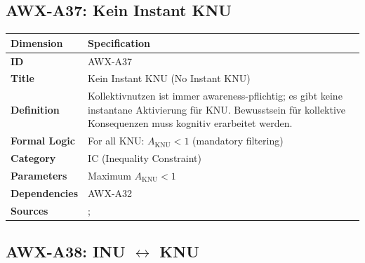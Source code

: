 
\subsection{AWX-A37: Kein Instant KNU}

\begin{table}[htbp]
\small
\begin{tabular}{p{3cm}p{11cm}}
\toprule
\textbf{Dimension} & \textbf{Specification} \\
\midrule
\textbf{ID} & AWX-A37 \\
\textbf{Title} & Kein Instant KNU (No Instant KNU) \\
\textbf{Definition} & Kollektivnutzen ist immer awareness-pflichtig; es gibt keine instantane Aktivierung für KNU. Bewusstsein für kollektive Konsequenzen muss kognitiv erarbeitet werden. \\
\textbf{Formal Logic} & For all KNU: $A_{\text{KNU}} < 1$ (mandatory filtering) \\
\textbf{Category} & IC (Inequality Constraint) \\
\textbf{Parameters} & Maximum $A_{\text{KNU}} < 1$ \\
\textbf{Dependencies} & AWX-A32 \\
\textbf{Sources} & \citet{fehr2004social}; \citet{ostrom1990governing} \\
\bottomrule
\end{tabular}
\end{table}


\subsection{AWX-A38: INU $\leftrightarrow$ KNU}


